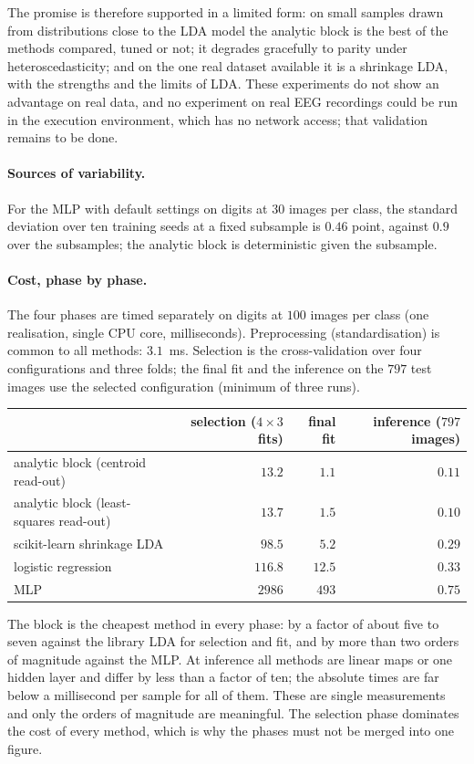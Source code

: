 \documentclass[11pt,a4paper]{article}
\theoremstyle{plain}
\theoremstyle{definition}
\theoremstyle{remark}
\begin{document}
The promise is therefore supported in a limited form: on small samples
drawn from distributions close to the LDA model the analytic block is the
best of the methods compared, tuned or not; it degrades gracefully to
parity under heteroscedasticity; and on the one real dataset available it
is a shrinkage LDA, with the strengths and the limits of LDA. These
experiments do not show an advantage on real data, and no experiment on
real EEG recordings could be run in the execution environment, which has no
network access; that validation remains to be done.

\paragraph{Sources of variability.} For the MLP with default settings on
digits at $30$ images per class, the standard deviation over ten training
seeds at a fixed subsample is $0.46$ point, against $0.9$ over the
subsamples; the analytic block is deterministic given the subsample.

\paragraph{Cost, phase by phase.} The four phases are timed separately
on digits at $100$ images per class (one realisation, single CPU core,
milliseconds). Preprocessing (standardisation) is common to all methods:
$3.1$~ms. Selection is the cross-validation over four configurations and
three folds; the final fit and the inference on the $797$ test images use
the selected configuration (minimum of three runs).
\begin{center}\small
\begin{tabular}{@{}lrrr@{}}
\toprule
 & selection ($4\times3$ fits) & final fit & inference ($797$ images) \\
\midrule
analytic block (centroid read-out) & $13.2$ & $1.1$ & $0.11$ \\
analytic block (least-squares read-out) & $13.7$ & $1.5$ & $0.10$ \\
scikit-learn shrinkage LDA & $98.5$ & $5.2$ & $0.29$ \\
logistic regression & $116.8$ & $12.5$ & $0.33$ \\
MLP & $2986$ & $493$ & $0.75$ \\
\bottomrule
\end{tabular}
\end{center}
The block is the cheapest method in every phase: by a factor of about five
to seven against the library LDA for selection and fit, and by more than
two orders of magnitude against the MLP. At inference all methods are
linear maps or one hidden layer and differ by less than a factor of ten;
the absolute times are far below a millisecond per sample for all of them.
These are single measurements and only the orders of magnitude are
meaningful. The selection phase dominates the cost of every method, which
is why the phases must not be merged into one figure.
\end{document}
